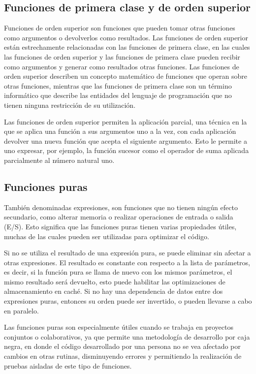
\subsection{Funciones de primera clase y de orden superior}

Funciones de orden superior son funciones que pueden tomar otras funciones como argumentos o devolverlos como resultados. Las funciones de orden superior están estrechamente relacionadas con las funciones de primera clase, en las cuales las funciones de orden superior y las funciones de primera clase pueden recibir como argumentos y generar como resultados otras funciones. Las funciones de orden superior describen un concepto matemático de funciones que operan sobre otras funciones, mientras que las funciones de primera clase son un término informático que describe las entidades del lenguaje de programación que no tienen ninguna restricción de su utilización.

Las funciones de orden superior permiten la aplicación parcial, una técnica en la que se aplica una función a sus argumentos uno a la vez, con cada aplicación devolver una nueva función que acepta el siguiente argumento. Esto le permite a uno expresar, por ejemplo, la función sucesor como el operador de suma aplicada parcialmente al número natural uno.

\subsection{Funciones puras}

También denominadas expresiones, son funciones que no tienen ningún efecto secundario, como alterar memoria o realizar operaciones de entrada o salida (E/S). Esto significa que las funciones puras tienen varias propiedades útiles, muchas de las cuales pueden ser utilizadas para optimizar el código.

Si no se utiliza el resultado de una expresión pura, se puede eliminar sin afectar a otras expresiones. El resultado es constante con respecto a la lista de parámetros, es decir, si la función pura se llama de nuevo con los mismos parámetros, el mismo resultado será devuelto, esto puede habilitar las optimizaciones de almacenamiento en caché. Si no hay una dependencia de datos entre dos expresiones puras, entonces su orden puede ser invertido, o pueden llevarse a cabo en paralelo.

Las funciones puras son especialmente útiles cuando se trabaja en proyectos conjuntos o colaborativos, ya que permite una metodología de desarrollo por caja negra, en donde el código desarrollado por una persona no se vea afectado por cambios en otras rutinas, disminuyendo errores y permitiendo la realización de pruebas aisladas de este tipo de funciones.

